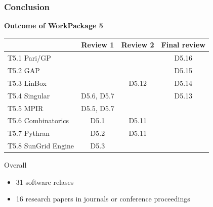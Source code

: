 \documentclass{beamer}
\begin{document}

    


\begin{frame}
  \frametitle{Conclusion}

  \textbf{Outcome of WorkPackage 5}
  \begin{center}
{\small
    \begin{tabular}{lccc}
    \toprule
        & Review 1 & Review 2 & Final review\\
    \midrule
    T5.1 Pari/GP & & & {\color{darkgreen} D5.16} \\
    T5.2 GAP     & & & {\color{darkgreen} D5.15} \\
    T5.3 LinBox  & & {D5.12} & {\color{darkgreen} D5.14} \\
    T5.4 Singular& D5.6, D5.7 & & {\color{darkgreen} D5.13} \\
    T5.5 MPIR    & D5.5, D5.7& & \\
    T5.6 Combinatorics  & D5.1& {D5.11} & \\
    T5.7 Pythran        & D5.2 & {D5.11} & \\
    T5.8 SunGrid Engine & D5.3 & & \\
    \bottomrule
    
  \end{tabular}
}
  \end{center}
  
  Overall
  \begin{itemize}
  \item 31 software relases
  \item 16 research papers in journals or conference proceedings
  \end{itemize}
\end{frame}
  
\end{document}
